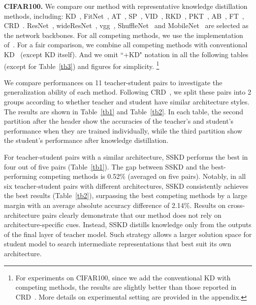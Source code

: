 \documentclass[runningheads]{llncs}
\begin{document}
\noindent
\textbf{CIFAR100.}
We compare our method with representative knowledge distillation methods, including: KD~\cite{KD}, FitNet~\cite{fitnets}, AT~\cite{AT}, SP~\cite{simi}, VID~\cite{vid}, RKD~\cite{rkd}, PKT~\cite{pkt}, AB~\cite{AB}, FT~\cite{FT}, CRD~\cite{crd}.  
ResNet~\cite{resnet}, wideResNet~\cite{wrn}, vgg~\cite{vgg}, ShuffleNet~\cite{shufflenet} and MobileNet~\cite{mobilenet} are selected as the network backbones.
For all competing methods, we use the implementation of~\cite{crd}.
For a fair comparison, we combine all competing methods with conventional KD~\cite{KD} (except KD itself). And we omit ``+KD" notation in all the following tables (except for Table~\ref{tb3}) and figures for simplicity. \footnote{For experiments on CIFAR100, since we add the conventional KD with competing methods, the results are slightly better than those reported in CRD~\cite{crd}. More details on experimental setting are provided in the appendix.}

We compare performances on 11 teacher-student pairs to investigate the generalization ability of each method. Following CRD~\cite{crd}, we split these pairs into 2 groups according to whether teacher and student have similar architecture styles. The results are shown in Table~\ref{tb1} and Table~\ref{tb2}. In each table, the second partition after the header show the accuracies of the teacher's and student's performance when they are trained individually, while the third partition show the student's performance after knowledge distillation.

For teacher-student pairs with a similar architecture, SSKD performs the best in four out of five pairs (Table~\ref{tb1}).
The gap between SSKD and the best-performing competing methods is 0.52\% (averaged on five pairs). Notably, in all six teacher-student pairs with different architectures, SSKD consistently achieves the best results (Table~\ref{tb2}), surpassing the best competing methods by a large margin with an average absolute accuracy difference of 2.14\%.
Results on cross-architecture pairs clearly demonstrate that our method does not rely on architecture-specific cues. Instead, SSKD distills knowledge only from the outputs of the final layer of teacher model. Such strategy allows a larger solution space for student model to search intermediate representations that best suit its own architecture.
\end{document}
